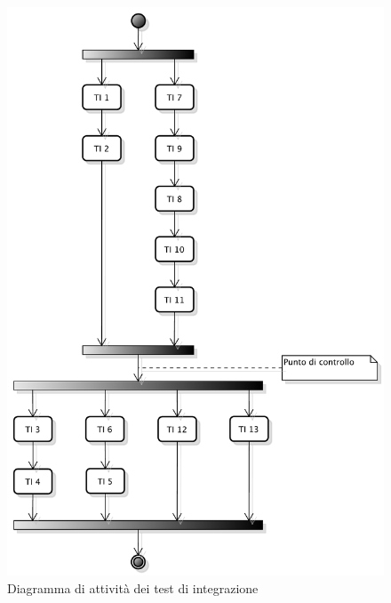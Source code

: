 \begin{center}
\begin{figure}[h]
\centering
\includegraphics[scale=0.55,keepaspectratio]{Img/testIntegrazione.pdf}
\caption{Diagramma di attività dei test di integrazione}
\end{figure}
\FloatBarrier
\end{center}

